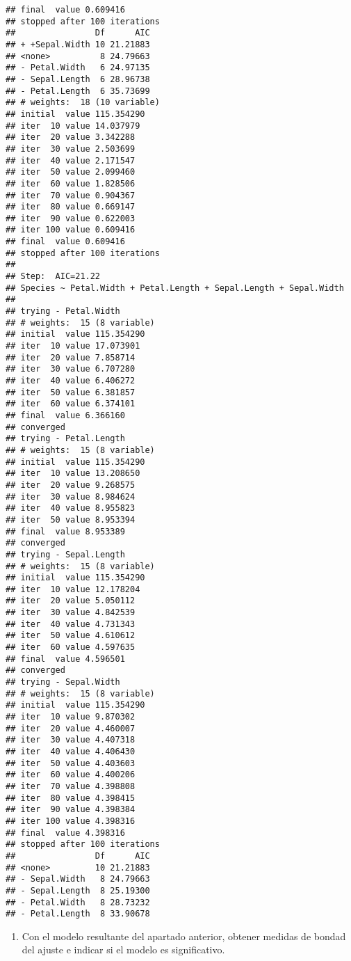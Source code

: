 \documentclass[
]{article}
\providecommand{\tightlist}{%
  \setlength{\itemsep}{0pt}\setlength{\parskip}{0pt}}
\begin{document}
\begin{verbatim}
## final  value 0.609416 
## stopped after 100 iterations
##                Df      AIC
## + +Sepal.Width 10 21.21883
## <none>          8 24.79663
## - Petal.Width   6 24.97135
## - Sepal.Length  6 28.96738
## - Petal.Length  6 35.73699
## # weights:  18 (10 variable)
## initial  value 115.354290 
## iter  10 value 14.037979
## iter  20 value 3.342288
## iter  30 value 2.503699
## iter  40 value 2.171547
## iter  50 value 2.099460
## iter  60 value 1.828506
## iter  70 value 0.904367
## iter  80 value 0.669147
## iter  90 value 0.622003
## iter 100 value 0.609416
## final  value 0.609416 
## stopped after 100 iterations
## 
## Step:  AIC=21.22
## Species ~ Petal.Width + Petal.Length + Sepal.Length + Sepal.Width
## 
## trying - Petal.Width 
## # weights:  15 (8 variable)
## initial  value 115.354290 
## iter  10 value 17.073901
## iter  20 value 7.858714
## iter  30 value 6.707280
## iter  40 value 6.406272
## iter  50 value 6.381857
## iter  60 value 6.374101
## final  value 6.366160 
## converged
## trying - Petal.Length 
## # weights:  15 (8 variable)
## initial  value 115.354290 
## iter  10 value 13.208650
## iter  20 value 9.268575
## iter  30 value 8.984624
## iter  40 value 8.955823
## iter  50 value 8.953394
## final  value 8.953389 
## converged
## trying - Sepal.Length 
## # weights:  15 (8 variable)
## initial  value 115.354290 
## iter  10 value 12.178204
## iter  20 value 5.050112
## iter  30 value 4.842539
## iter  40 value 4.731343
## iter  50 value 4.610612
## iter  60 value 4.597635
## final  value 4.596501 
## converged
## trying - Sepal.Width 
## # weights:  15 (8 variable)
## initial  value 115.354290 
## iter  10 value 9.870302
## iter  20 value 4.460007
## iter  30 value 4.407318
## iter  40 value 4.406430
## iter  50 value 4.403603
## iter  60 value 4.400206
## iter  70 value 4.398808
## iter  80 value 4.398415
## iter  90 value 4.398384
## iter 100 value 4.398316
## final  value 4.398316 
## stopped after 100 iterations
##                Df      AIC
## <none>         10 21.21883
## - Sepal.Width   8 24.79663
## - Sepal.Length  8 25.19300
## - Petal.Width   8 28.73232
## - Petal.Length  8 33.90678
\end{verbatim}

\begin{enumerate}
\def\labelenumi{\arabic{enumi})}
\setcounter{enumi}{4}
\tightlist
\item
  Con el modelo resultante del apartado anterior, obtener medidas de
  bondad del ajuste e indicar si el modelo es significativo.
\end{enumerate}
\end{document}
